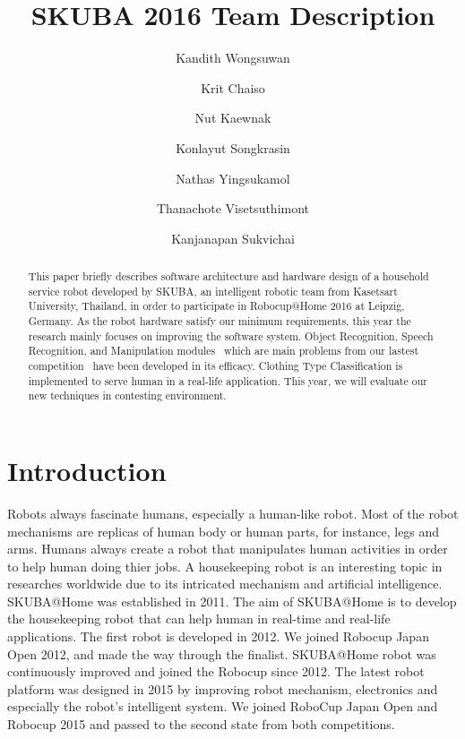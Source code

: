 \documentclass{llncs}
\begin{document}
\title{SKUBA 2016 Team Description}
\author{Kandith Wongsuwan
\and Krit Chaiso
\and Nut Kaewnak
\and Konlayut Songkrasin
\and Nathas Yingsukamol
\and Thanachote Visetsuthimont
\and Kanjanapan Sukvichai
}


\maketitle

\begin{abstract}
This paper briefly describes software architecture and hardware design of a household service robot developed by SKUBA, an intelligent robotic team from Kasetsart University, Thailand, in order to participate in Robocup@Home 2016 at Leipzig, Germany. As the robot hardware satisfy our minimum requirements, this year the research mainly focuses on improving the software system. Object Recognition, Speech Recognition, and Manipulation modules \textemdash\ which are main problems from our lastest competition \textemdash\ have been developed in its efficacy. Clothing Type Classification is implemented to serve human in a real-life application. This year, we will evaluate our new techniques in contesting environment.

\end{abstract}

\section{Introduction}

Robots always fascinate humans, especially a human-like robot. Most of the robot mechanisms are replicas of human body or human parts, for instance, legs and arms. Humans always create a robot that manipulates human activities in order to help human doing thier jobs. A housekeeping robot is an interesting topic in researches worldwide due to its intricated mechanism and artificial intelligence. SKUBA@Home was established in 2011. The aim of SKUBA@Home is to develop the housekeeping robot that can help human in real-time and real-life applications. The first robot is developed in 2012. We joined Robocup Japan Open 2012, and made the way through the finalist. SKUBA@Home robot was continuously improved and joined the Robocup since 2012. The latest robot platform was designed in 2015 by improving robot mechanism, electronics and especially the robot's intelligent system. We joined RoboCup Japan Open and Robocup 2015 and passed to the second state from both competitions. 
\end{document}
